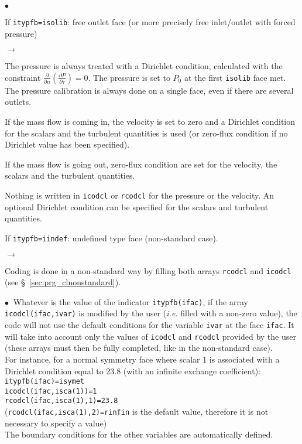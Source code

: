 {{{\begin{list}{$\bullet$}{}
\item If \texttt{itypfb=isolib}: free outlet face (or more precisely free
      inlet/outlet with forced pressure)
\begin{list}{$\rightarrow$}{}
\item The pressure is always treated with a Dirichlet condition, calculated
      with the constraint $\displaystyle \frac{\partial }{\partial n}\left(\frac{ \partial P}{\partial \tau}\right)=0$.
      The pressure is set to $P_0$ at the first \texttt{isolib} face met.
      The pressure calibration is always done on a single face, even if there are
      several outlets.
\item If the mass flow is coming in, the velocity is set to zero
      and a Dirichlet condition for the scalars and the turbulent quantities is used
      (or zero-flux condition if no Dirichlet value has been specified).
\item If the mass flow is going out, zero-flux condition are set for the velocity,
      the scalars and the turbulent quantities.
\item Nothing is written in \texttt{icodcl} or \texttt{rcodcl} for the pressure or
      the velocity. An optional Dirichlet condition can be specified for the scalars
      and turbulent quantities.
\end{list}

\item If \texttt{itypfb=iindef}: undefined type face (non-standard case).
\begin{list}{$\rightarrow$}{}
\item Coding is done in a non-standard way by filling both arrays \texttt{rcodcl} and
      \texttt{icodcl} (see \S~\ref{sec:prg_clnonstandard}).
\end{list}
\end{list}

$\bullet\ $ Whatever is the value of the indicator \texttt{itypfb(ifac)}, if
the array \texttt{icodcl(ifac,ivar)} is modified by the user ({\em i.e.} filled
with a non-zero value), the code will not use the default
conditions for the variable \texttt{ivar} at the face \texttt{ifac}. It will
take into account only the values of \texttt{icodcl} and \texttt{rcodcl} provided by the
user (these arrays must then be fully completed, like in the non-standard case). \\
For instance, for a normal symmetry face where scalar 1 is associated with a
Dirichlet condition equal to 23.8 (with an infinite exchange
coefficient):\\
\hspace*{2cm}\texttt{itypfb(ifac)=isymet}\\
\hspace*{2cm}\texttt{icodcl(ifac,isca(1))=1}\\
\hspace*{2cm}\texttt{rcodcl(ifac,isca(1),1)=23.8}\\
(\texttt{rcodcl(ifac,isca(1),2)=rinfin} is the default value, therefore it is
not necessary to specify a value)\\
The boundary conditions for the other variables are automatically
defined.

}}}

